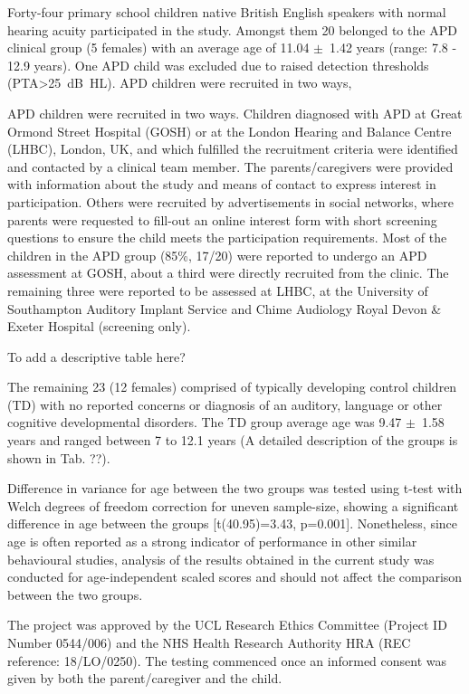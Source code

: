 \documentclass[a4paper, twoside]{templates/ociamthesis}
\begin{document}
Forty-four primary school children native British English speakers with normal hearing acuity participated in the study. Amongst them 20 belonged to the APD clinical group (5 females) with an average age of 11.04 \(\pm\)~1.42 years (range: 7.8 - 12.9 years). One APD child was excluded due to raised detection thresholds (PTA\textgreater25~dB~HL). APD children were recruited in two ways,

APD children were recruited in two ways. Children diagnosed with APD at Great Ormond Street Hospital (GOSH) or at the London Hearing and Balance Centre (LHBC), London, UK, and which fulfilled the recruitment criteria were identified and contacted by a clinical team member. The parents/caregivers were provided with information about the study and means of contact to express interest in participation. Others were recruited by advertisements in social networks, where parents were requested to fill-out an online interest form with short screening questions to ensure the child meets the participation requirements. Most of the children in the APD group (85\%, 17/20) were reported to undergo an APD assessment at GOSH, about a third were directly recruited from the clinic. The remaining three were reported to be assessed at LHBC, at the University of Southampton Auditory Implant Service and Chime Audiology Royal Devon \& Exeter Hospital (screening only).

\colorbox[HTML]{CCCCFF}{To add a descriptive table here?}

The remaining 23 (12 females) comprised of typically developing control children (TD) with no reported concerns or diagnosis of an auditory, language or other cognitive developmental disorders. The TD group average age was 9.47 \(\pm\)~1.58 years and ranged between 7 to 12.1 years (A detailed description of the groups is shown in Tab. ??).

Difference in variance for age between the two groups was tested using t-test with Welch degrees of freedom correction for uneven sample-size, showing a significant difference in age between the groups {[}t(40.95)=3.43, p=0.001{]}. Nonetheless, since age is often reported as a strong indicator of performance in other similar behavioural studies, analysis of the results obtained in the current study was conducted for age-independent scaled scores and should not affect the comparison between the two groups.

The project was approved by the UCL Research Ethics Committee (Project ID Number 0544/006) and the NHS Health Research Authority HRA (REC reference: 18/LO/0250). The testing commenced once an informed consent was given by both the parent/caregiver and the child.
\end{document}

